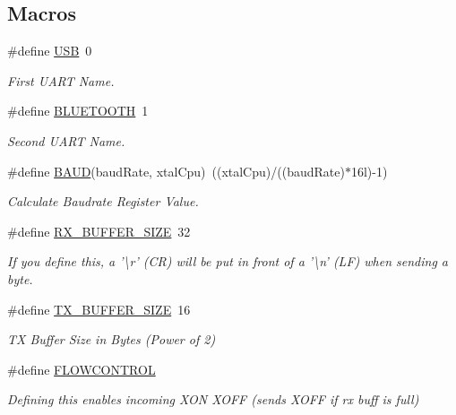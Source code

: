 \subsection*{Macros}
\begin{DoxyCompactItemize}
\item 
\#define \hyperlink{group__uart_ga779bf099075a999d1074357fccbd466b}{U\-S\-B}~0
\begin{DoxyCompactList}\small\item\em First U\-A\-R\-T Name. \end{DoxyCompactList}\item 
\#define \hyperlink{group__uart_ga3f30897fa8435dc9811642367a328be8}{B\-L\-U\-E\-T\-O\-O\-T\-H}~1
\begin{DoxyCompactList}\small\item\em Second U\-A\-R\-T Name. \end{DoxyCompactList}\item 
\#define \hyperlink{group__uart_gafccfd7d1315f0763ac404c6104883341}{B\-A\-U\-D}(baud\-Rate, xtal\-Cpu)~((xtal\-Cpu)/((baud\-Rate)$\ast$16l)-\/1)
\begin{DoxyCompactList}\small\item\em Calculate Baudrate Register Value. \end{DoxyCompactList}\item 
\#define \hyperlink{group__uart_ga739a2a1a0047c98ac1b18ecd25dac092}{R\-X\-\_\-\-B\-U\-F\-F\-E\-R\-\_\-\-S\-I\-Z\-E}~32
\begin{DoxyCompactList}\small\item\em If you define this, a '\textbackslash{}r' (C\-R) will be put in front of a '\textbackslash{}n' (L\-F) when sending a byte. \end{DoxyCompactList}\item 
\#define \hyperlink{group__uart_ga9ab33647617098646990fe263600b650}{T\-X\-\_\-\-B\-U\-F\-F\-E\-R\-\_\-\-S\-I\-Z\-E}~16
\begin{DoxyCompactList}\small\item\em T\-X Buffer Size in Bytes (Power of 2) \end{DoxyCompactList}\item 
\#define \hyperlink{group__uart_gaff1f07741fbe1f53f46098687f0a05e2}{F\-L\-O\-W\-C\-O\-N\-T\-R\-O\-L}
\begin{DoxyCompactList}\small\item\em Defining this enables incoming X\-O\-N X\-O\-F\-F (sends X\-O\-F\-F if rx buff is full) \end{DoxyCompactList}\item 

\end{DoxyCompactItemize}
